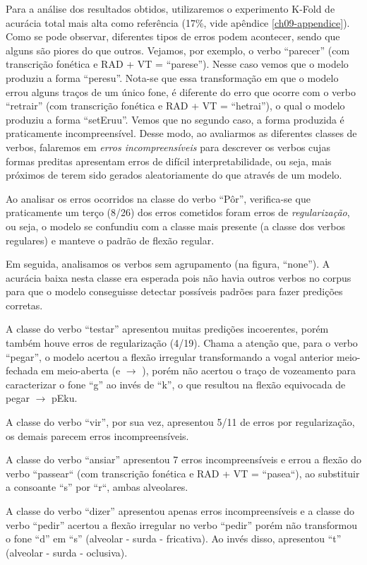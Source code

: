 Para a análise dos resultados obtidos, utilizaremos o experimento K-Fold de acurácia total mais alta como referência (17\%, vide apêndice \ref{ch09-appendice}). Como se pode observar, diferentes tipos de erros podem acontecer, sendo que alguns são piores do que outros. Vejamos, por exemplo, o verbo “parecer” (com transcrição fonética e RAD + VT = “parese”). Nesse caso vemos que o modelo produziu a forma “peresu”. Nota-se que essa transformação em que o modelo errou alguns traços de um único fone, é diferente do erro que ocorre com o verbo “retrair” (com transcrição fonética e RAD + VT = “hetrai”), o qual o modelo produziu a forma “setEruu”. Vemos que no segundo caso, a forma produzida é praticamente incompreensível. Desse modo, ao avaliarmos as diferentes classes de verbos, falaremos em \textit{erros incompreensíveis} para descrever os verbos cujas formas preditas apresentam erros de difícil interpretabilidade, ou seja, mais próximos de terem sido gerados aleatoriamente do que através de um modelo. 

Ao analisar os erros ocorridos na classe do verbo “Pôr”, verifica-se que praticamente um terço (8/26) dos erros cometidos foram erros de \textit{regularização}, ou seja, o modelo se confundiu com a classe mais presente (a classe dos verbos regulares) e manteve o padrão de flexão regular. 

Em seguida, analisamos os verbos sem agrupamento (na figura, “none”). A acurácia baixa nesta classe era esperada pois não havia outros verbos no corpus para que o modelo conseguisse detectar possíveis padrões para fazer predições corretas. 

A classe do verbo “testar” apresentou muitas predições incoerentes, porém também houve erros de regularização (4/19). Chama a atenção que, para o verbo “pegar”, o modelo acertou a flexão irregular transformando a vogal anterior meio-fechada em meio-aberta (e $\rightarrow$ \textepsilon), porém não acertou o traço de vozeamento para caracterizar o fone “g” ao invés de “k”, o que resultou na flexão equivocada de pegar $\rightarrow$ pEku.

A classe do verbo “vir”, por sua vez, apresentou 5/11 de erros por regularização, os demais parecem erros incompreensíveis.

A classe do verbo “ansiar” apresentou 7 erros incompreensíveis e errou a flexão do verbo “passear“ (com transcrição fonética e RAD + VT = “pasea“), ao substituir a consoante “s” por “r“, ambas alveolares. 

A classe do verbo “dizer” apresentou apenas erros incompreensíveis e a classe do verbo “pedir” acertou a flexão irregular no verbo “pedir” porém não transformou o fone “d” em “s” (alveolar - surda - fricativa). Ao invés disso, apresentou “t” (alveolar - surda - oclusiva).

